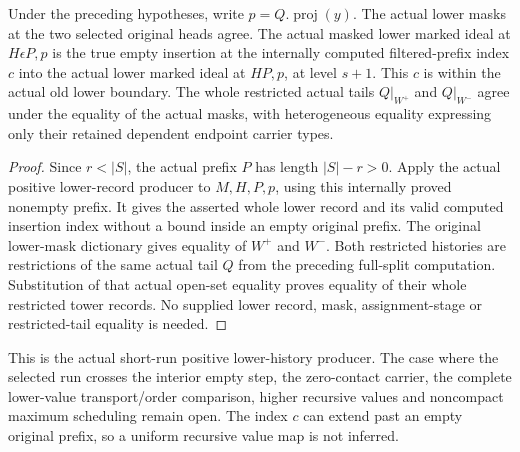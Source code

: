 \begin{theorem}
\label{hir:original-interior-selected-positive-short-lower-diagram}
\leanok
{}
Under the preceding hypotheses, write $p=Q.\operatorname{proj}(y)$.
The actual lower masks at the two selected original heads agree.
The actual masked lower marked ideal at $H\epsilon P,p$ is the true empty
insertion at the internally computed filtered-prefix index $c$ into the
actual lower marked ideal at $HP,p$, at level $s+1$.  This $c$ is within the
actual old lower boundary.  The whole restricted actual tails $Q|_{W^+}$ and
$Q|_{W^-}$ agree under the equality of the actual masks, with heterogeneous
equality expressing only their retained dependent endpoint carrier types.
\end{theorem}
\begin{proof}
Since $r<|S|$, the actual prefix $P$ has length $|S|-r>0$.  Apply the actual
positive lower-record producer to $M,H,P,p$, using this internally proved
nonempty prefix.  It gives the asserted whole lower record and its valid
computed insertion index without a bound inside an empty original prefix.
The original lower-mask dictionary gives equality of $W^+$ and $W^-$.
Both restricted histories are restrictions of the same actual tail $Q$ from
the preceding full-split computation.  Substitution of that actual open-set
equality proves equality of their whole restricted tower records.  No
supplied lower record, mask, assignment-stage or restricted-tail equality
is needed.
\end{proof}

This is the actual short-run positive lower-history producer.  The case where
the selected run crosses the interior empty step, the zero-contact carrier,
the complete lower-value transport/order comparison, higher recursive values
and noncompact maximum scheduling remain open.  The index $c$ can extend past
an empty original prefix, so a uniform recursive value map is not inferred.
